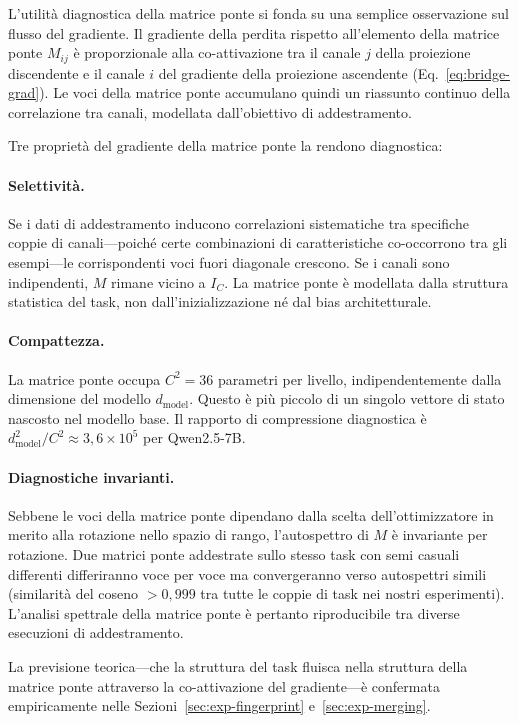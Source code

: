 \documentclass[11pt]{article}
\begin{document}
L'utilit\`a diagnostica della matrice ponte si fonda su una semplice
osservazione sul flusso del gradiente. Il gradiente della perdita
rispetto all'elemento della matrice ponte $M_{ij}$ \`e proporzionale
alla co-attivazione tra il canale $j$ della proiezione discendente e il
canale $i$ del gradiente della proiezione ascendente
(Eq.~\ref{eq:bridge-grad}).
Le voci della matrice ponte accumulano quindi un riassunto continuo
della correlazione tra canali, modellata dall'obiettivo di
addestramento.

Tre propriet\`a del gradiente della matrice ponte la rendono
diagnostica:

\paragraph{Selettivit\`a.}
Se i dati di addestramento inducono correlazioni sistematiche tra
specifiche coppie di canali---poich\'e certe combinazioni di
caratteristiche co-occorrono tra gli esempi---le corrispondenti voci
fuori diagonale crescono. Se i canali sono indipendenti, $M$ rimane
vicino a $I_C$. La matrice ponte \`e modellata dalla struttura
statistica del task, non dall'inizializzazione n\'e dal bias
architetturale.

\paragraph{Compattezza.}
La matrice ponte occupa $C^2 = 36$ parametri per livello,
indipendentemente dalla dimensione del modello $d_\text{model}$.
Questo \`e pi\`u piccolo di un singolo vettore di stato nascosto nel
modello base. Il rapporto di compressione diagnostica \`e
$d_\text{model}^2 / C^2 \approx 3{,}6 \times 10^5$ per Qwen2.5-7B.

\paragraph{Diagnostiche invarianti.}
Sebbene le voci della matrice ponte dipendano dalla scelta
dell'ottimizzatore in merito alla rotazione nello spazio di rango,
l'autospettro di $M$ \`e invariante per rotazione. Due matrici ponte
addestrate sullo stesso task con semi casuali differenti differiranno
voce per voce ma convergeranno verso autospettri simili (similarit\`a
del coseno $> 0{,}999$ tra tutte le coppie di task nei nostri
esperimenti). L'analisi spettrale della matrice ponte \`e pertanto
riproducibile tra diverse esecuzioni di addestramento.

La previsione teorica---che la struttura del task fluisca nella
struttura della matrice ponte attraverso la co-attivazione del
gradiente---\`e confermata empiricamente nelle
Sezioni~\ref{sec:exp-fingerprint} e~\ref{sec:exp-merging}.
\end{document}
